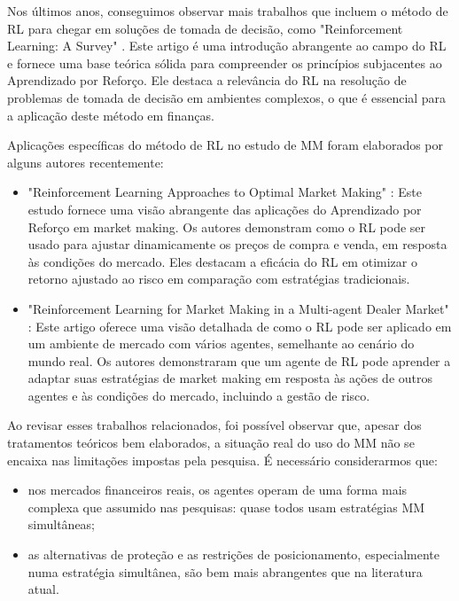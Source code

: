 Nos últimos anos, conseguimos observar mais trabalhos que incluem o método de RL para chegar em soluções de tomada de decisão, como "Reinforcement Learning: A Survey" \citep{Kaelbling1996}. Este artigo é uma introdução abrangente ao campo do RL e fornece uma base teórica sólida para compreender os princípios subjacentes ao Aprendizado por Reforço. Ele destaca a relevância do RL na resolução de problemas de tomada de decisão em ambientes complexos, o que é essencial para a aplicação deste método em finanças.

Aplicações específicas do método de RL no estudo de MM foram elaborados por alguns autores recentemente:
\begin{itemize}
    \item "Reinforcement Learning Approaches to Optimal Market Making" \citep{Gasperov2021}: Este estudo fornece uma visão abrangente das aplicações do Aprendizado por Reforço em market making. Os autores demonstram como o RL pode ser usado para ajustar dinamicamente os preços de compra e venda, em resposta às condições do mercado. Eles destacam a eficácia do RL em otimizar o retorno ajustado ao risco em comparação com estratégias tradicionais.
    \item "Reinforcement Learning for Market Making in a Multi-agent Dealer Market" \citep{Ganesh2019}: Este artigo oferece uma visão detalhada de como o RL pode ser aplicado em um ambiente de mercado com vários agentes, semelhante ao cenário do mundo real. Os autores demonstraram que um agente de RL pode aprender a adaptar suas estratégias de market making em resposta às ações de outros agentes e às condições do mercado, incluindo a gestão de risco.
\end{itemize}


Ao revisar esses trabalhos relacionados, foi possível observar que, apesar dos tratamentos teóricos bem elaborados, a situação real do uso do MM não se encaixa nas limitações impostas pela pesquisa. É necessário considerarmos que:

\begin{itemize}
    \item nos mercados financeiros reais, os agentes operam de uma forma mais complexa que assumido nas pesquisas: quase todos usam estratégias MM simultâneas;
    \item as alternativas de proteção e as restrições de posicionamento, especialmente numa estratégia simultânea, são bem mais abrangentes que na literatura atual. 
\end{itemize}

